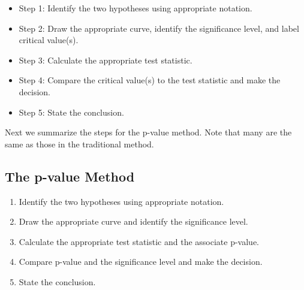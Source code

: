 \documentclass[12pt, letterpaper]{article}
\theoremstyle{definition}
\begin{document}
\begin{itemize}
\item Step 1:  Identify the two hypotheses using appropriate notation.

\vfill

\item Step 2:  Draw the appropriate curve, identify the significance level, and label critical value(s).

\vfill

\item Step 3:  Calculate the appropriate test statistic.

\vfill

\item Step 4:  Compare the critical value(s) to the test statistic and make the decision.

\vfill

\item Step 5:  State the conclusion.

\vfill

\end{itemize}

\newpage

\noindent Next we summarize the steps for the p-value method.  Note that many are the same as those in the traditional method.

\begin{statement}
\section*{The p-value Method}

\begin{enumerate}

\item Identify the two hypotheses using appropriate notation.

\item Draw the appropriate curve and identify the significance level.

\item Calculate the appropriate test statistic and the associate p-value.

\item Compare p-value and the significance level and make the decision.

\item State the conclusion.

\end{enumerate}
\end{statement}
\end{document}
